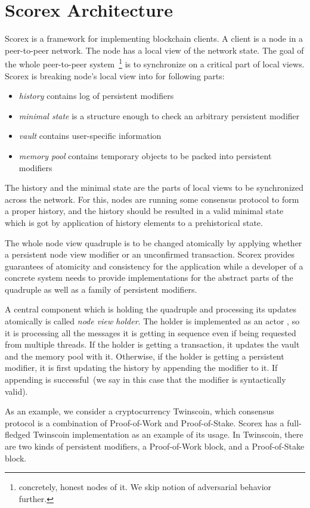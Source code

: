 
\section{Scorex Architecture}

Scorex is a framework for implementing blockchain clients. A client is a node in a peer-to-peer network. The node has a local view of the network state. The goal of the whole peer-to-peer system~\footnote{concretely, honest nodes of it. We skip notion of adversarial behavior further.} is to synchronize on a critical part of local views. Scorex is breaking node's local view into for following parts: 

\begin{itemize}
\item{\em history} contains log of persistent modifiers
\item{\em minimal state} is a structure enough to check an arbitrary persistent modifier
\item{\em vault} contains user-specific information
\item{\em memory pool} contains temporary objects to be packed into persistent modifiers 
\end{itemize}

The history and the minimal state are the parts of local views to be synchronized across the network. For this, nodes are running some consensus protocol to form a proper history, and the history should be resulted in a valid minimal state which is got by application of history elements to a prehistorical state.

The whole node view quadruple is to be changed atomically by applying whether a persistent node view modifier or an unconfirmed transaction. Scorex provides guarantees of atomicity and consistency for the application while a developer of a concrete system needs to provide implementations for the abstract parts of the quadruple as well as a family of persistent modifiers.

A central component which is holding the quadruple {\em <history, minimal state, vault, memory pool>} and processing its updates atomically is called {\em node view holder}. The holder is implemented as an actor , so it is processing all the messages it is getting in sequence even if being requested from multiple threads. If the holder is getting a transaction, it updates the vault and the memory pool with it. Otherwise, if the holder is getting a persistent modifier, it is first updating the history by appending the modifier to it. If appending is successful~(we say in this case that the modifier is syntactically valid). 

As an example, we consider a cryptocurrency Twinscoin, which consensus protocol is a combination of Proof-of-Work and Proof-of-Stake. Scorex has a full-fledged Twinscoin implementation as an example of its usage. In Twinscoin, there are two kinds of persistent modifiers, a Proof-of-Work block, and a Proof-of-Stake block. 
